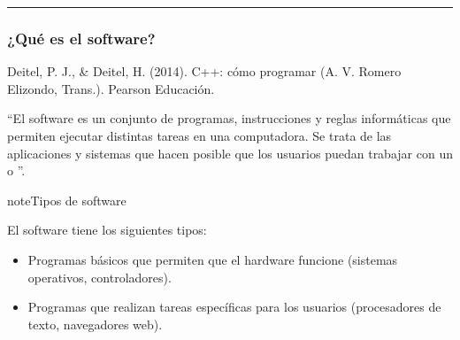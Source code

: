 \documentclass[letterpaper,10pt,spanish]{sphinxmanual}
\begin{document}
\bigskip\hrule\bigskip



\subsubsection{¿Qué es el software?}
\label{\detokenize{1_guias/10ofimatica/G1012:que-es-el-software}}
\sphinxAtStartPar
%
\begin{footnote}[1]\sphinxAtStartFootnote
Deitel, P. J., \& Deitel, H. (2014). C++: cómo programar (A. V. Romero Elizondo, Trans.). Pearson Educación.
%
\end{footnote} “El software es un conjunto de programas, instrucciones y reglas informáticas que permiten ejecutar distintas tareas en una computadora. Se trata de las aplicaciones y sistemas que hacen posible que los usuarios puedan trabajar con un  o ”.

\begin{sphinxadmonition}{note}{Tipos de software}

\sphinxAtStartPar
\sphinxfootnotemark[1] El software tiene los siguientes tipos:
\begin{itemize}
\item {} 
\sphinxAtStartPar
{} Programas básicos que permiten que el hardware funcione (sistemas operativos, controladores).

\item {} 
\sphinxAtStartPar
{} Programas que realizan tareas específicas para los usuarios (procesadores de texto, navegadores web).

\end{itemize}
\end{sphinxadmonition}
\end{document}
